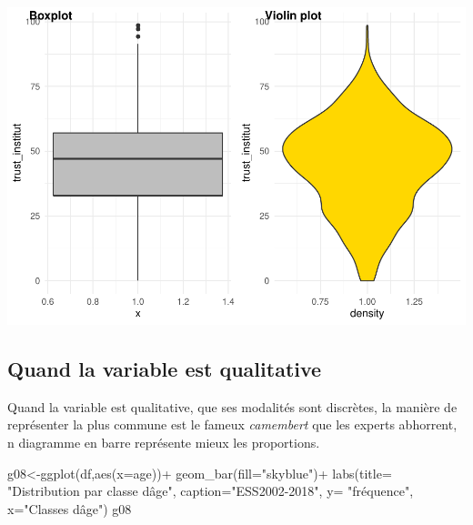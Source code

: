 \documentclass[
]{book}
\newenvironment{Shaded}{\begin{snugshade}}{\end{snugshade}}
\newcommand{\AttributeTok}[1]{\textcolor[rgb]{0.77,0.63,0.00}{#1}}
\newcommand{\FunctionTok}[1]{\textcolor[rgb]{0.00,0.00,0.00}{#1}}
\newcommand{\NormalTok}[1]{#1}
\newcommand{\OtherTok}[1]{\textcolor[rgb]{0.56,0.35,0.01}{#1}}
\newcommand{\SpecialCharTok}[1]{\textcolor[rgb]{0.00,0.00,0.00}{#1}}
\newcommand{\StringTok}[1]{\textcolor[rgb]{0.31,0.60,0.02}{#1}}
\begin{document}
\includegraphics{bookdown-demo_files/figure-latex/308a-1.pdf}

\hypertarget{quand-la-variable-est-qualitative}{%
\subsection{Quand la variable est qualitative}\label{quand-la-variable-est-qualitative}}

Quand la variable est qualitative, que ses modalités sont discrètes, la manière de représenter la plus commune est le fameux \emph{camembert} que les experts abhorrent, n diagramme en barre représente mieux les proportions.

\begin{Shaded}
\begin{Highlighting}[]
\NormalTok{g08}\OtherTok{\textless{}{-}}\FunctionTok{ggplot}\NormalTok{(df,}\FunctionTok{aes}\NormalTok{(}\AttributeTok{x=}\NormalTok{age))}\SpecialCharTok{+}
  \FunctionTok{geom\_bar}\NormalTok{(}\AttributeTok{fill=}\StringTok{"skyblue"}\NormalTok{)}\SpecialCharTok{+}
  \FunctionTok{labs}\NormalTok{(}\AttributeTok{title=} \StringTok{"Distribution par classe d\textquotesingle{}âge"}\NormalTok{, }
       \AttributeTok{caption=}\StringTok{"ESS2002{-}2018"}\NormalTok{,}
       \AttributeTok{y=} \StringTok{"fréquence"}\NormalTok{,}
       \AttributeTok{x=}\StringTok{"Classes d\textquotesingle{}âge"}\NormalTok{) }
\NormalTok{g08}
\end{Highlighting}
\end{Shaded}
\end{document}

